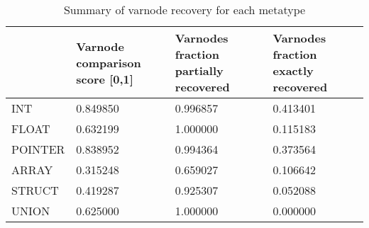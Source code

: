 \begin{table}[t]
\centering
\caption{Summary of varnode recovery for each metatype}
\label{table:metatype-recovery-summary}
\begin{tabular}{lp{6.0cm}p{6.0cm}p{6.0cm}}
\toprule
{} &  Varnode comparison score [0,1] &  Varnodes fraction partially recovered &  Varnodes fraction exactly recovered \\
\midrule
INT     &                        0.849850 &                               0.996857 &                             0.413401 \\
FLOAT   &                        0.632199 &                               1.000000 &                             0.115183 \\
POINTER &                        0.838952 &                               0.994364 &                             0.373564 \\
ARRAY   &                        0.315248 &                               0.659027 &                             0.106642 \\
STRUCT  &                        0.419287 &                               0.925307 &                             0.052088 \\
UNION   &                        0.625000 &                               1.000000 &                             0.000000 \\
\bottomrule
\end{tabular}
\end{table}
